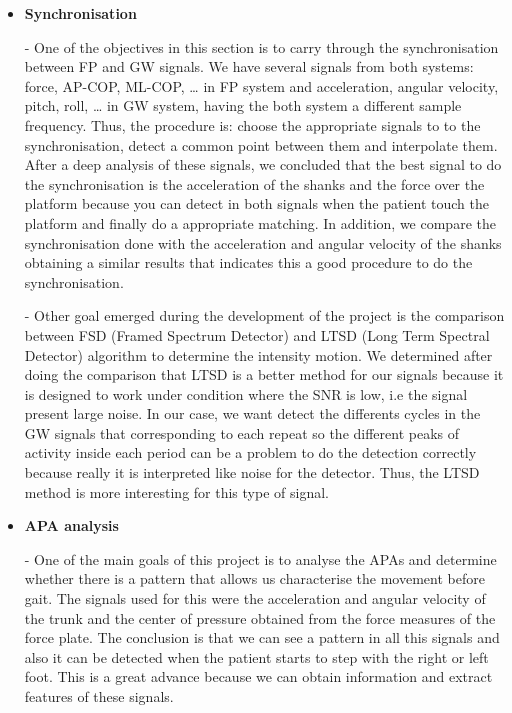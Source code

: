 \begin{itemize}
\item \textbf{Synchronisation}

-	One of the objectives in this section is to carry through the synchronisation between FP and GW signals. We have several signals from both systems: force, AP-COP, ML-COP, … in FP system and acceleration, angular velocity, pitch, roll, … in GW system, having the both system a different sample frequency. Thus, the procedure is: choose the appropriate signals to to the synchronisation, detect a common point between them and interpolate them.
After a deep analysis of these signals, we concluded that the best signal to do the synchronisation is the acceleration of the shanks and the force over the platform because you can detect in both signals when the patient touch the platform and finally do a appropriate matching.
In addition, we compare the synchronisation done with the acceleration and angular velocity of the shanks obtaining a similar results that indicates this a good procedure to do the synchronisation.

-	Other goal emerged during the development of the project is the comparison between FSD (Framed Spectrum Detector) and LTSD (Long Term Spectral Detector) algorithm to determine the intensity motion. We determined after doing the comparison that LTSD is a better method for our signals because it is designed to work under condition where the SNR is low, i.e the signal present large noise. In our case, we want detect the differents cycles in the GW signals that corresponding to each repeat so the different peaks of activity inside each period can be a problem to do the detection correctly because really it is interpreted like noise for the detector. Thus, the LTSD method is more interesting for this type of signal.


\item \textbf{APA analysis}

-	One of the main goals of this project is to analyse the APAs and determine whether there is a pattern that allows us characterise the movement before gait. The signals used for this were the acceleration and angular velocity of the trunk and the center of pressure obtained from the force measures of the force plate. The conclusion is that we can see a pattern in all this signals and also it can be detected when the patient starts to step with the right or left foot. This is a great advance because we can obtain information and extract features of these signals.


\end{itemize}
